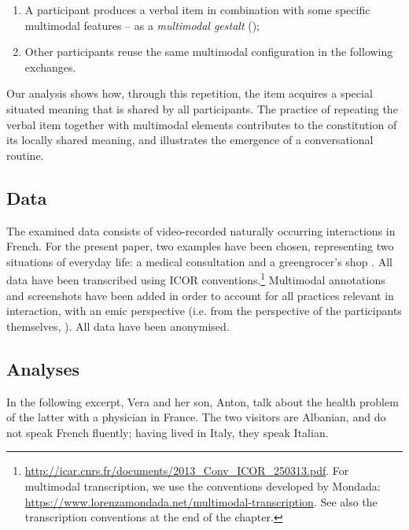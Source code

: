 \documentclass[output=paper]{langscibook}
\begin{document}
\begin{enumerate}

\item A participant produces a verbal item in combination with some specific multimodal features – as a \textit{multimodal gestalt} (\citealt{Mondada2014Local, Mondada2018});

\item Other participants reuse the same multimodal configuration in the following exchanges.

\end{enumerate}

Our analysis shows how, through this repetition, the item acquires a special situated meaning that is shared by all participants. The practice of repeating the verbal item together with multimodal elements contributes to the constitution of its locally shared meaning, and illustrates the emergence of a conversational routine.


\subsection{Data}

The examined data consists of video-recorded naturally occurring interactions in French. For the present paper, two examples have been chosen, representing two situations of everyday life: a medical consultation  and a greengrocer's shop . All data have been transcribed using ICOR conventions.\footnote{\url{http://icar.cnrs.fr/documents/2013_Conv_ICOR_250313.pdf}. For multimodal transcription, we use the conventions developed by Mondada: \url{https://www.lorenzamondada.net/multimodal-transcription}. See also the transcription conventions at the end of the chapter.} Multimodal annotations and screenshots have been added in order to account for all practices relevant in interaction, with an emic perspective (i.e. from the perspective of the participants themselves, \citealt{Pike1954}). All data have been anonymised.

\subsection{Analyses}\largerpage[2]

In the following excerpt, Vera and her son, Anton, talk about the health problem of the latter with a physician in France. The two visitors are Albanian, and do not speak French fluently; having lived in Italy, they speak Italian.
\end{document}
